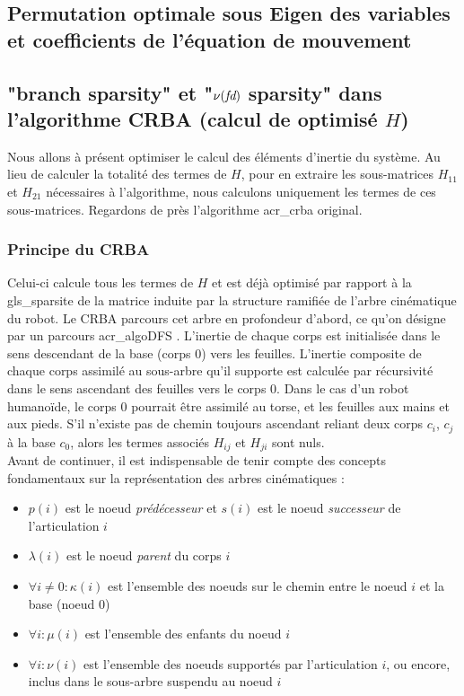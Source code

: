 \documentclass{report}
\begin{document}
\subsection{Permutation optimale sous Eigen des variables et coefficients de l'équation de mouvement}


\subsection{"branch sparsity" et "$\nu(\emph{fd})$ sparsity" dans l'algorithme CRBA (calcul de optimisé $H$)}

Nous allons à présent optimiser le calcul des éléments d'inertie du système. Au lieu de calculer la totalité des termes de $H$, pour en extraire les sous-matrices $H_{11}$ et $H_{21}$ nécessaires à l'algorithme, nous calculons uniquement les termes de ces sous-matrices. Regardons de près l'algorithme \gls{acr_crba} original.\\

\subsubsection{Principe du CRBA}
Celui-ci calcule tous les termes de $H$ et est déjà optimisé par rapport à la \gls{gls_sparsite} de la matrice induite par la structure ramifiée de l'arbre cinématique du robot. Le CRBA parcours cet arbre en profondeur d'abord, ce qu'on désigne par un parcours \gls{acr_algoDFS} \cite{bib_deepFirstSearch}. L'inertie de chaque corps est initialisée dans le sens descendant de la base (corps 0) vers les feuilles. L'inertie composite de chaque corps assimilé au sous-arbre qu'il supporte est calculée par récursivité dans le sens ascendant des feuilles vers le corps 0. Dans le cas d'un robot humanoïde, le corps 0 pourrait être assimilé au torse, et les feuilles aux mains et aux pieds. S'il n'existe pas de chemin toujours ascendant reliant deux corps $c_i$, $c_j$ à la base $c_0$, alors les termes associés $H_{ij}$ et $H_{ji}$ sont nuls.\\
Avant de continuer, il est indispensable de tenir compte des concepts fondamentaux sur la représentation des arbres cinématiques \cite{ch_algSpa_equationMouvement}:

\begin{itemize}
\item $p(i)$ est le noeud \emph{prédécesseur} et $s(i)$ est le noeud \emph{successeur} de l'articulation $i$
\item $\lambda(i)$ est le noeud \emph{parent} du corps $i$
\item $\forall i \neq 0: \kappa(i)$ est l'ensemble des noeuds sur le chemin entre le noeud $i$ et la base (noeud $0$)
\item $\forall i: \mu (i)$  est l'ensemble des enfants du noeud $i$
\item $\forall i: \nu (i)$  est l'ensemble des noeuds supportés par l'articulation $i$, ou encore, inclus dans le sous-arbre suspendu au noeud $i$
\end{itemize}
\end{document}
